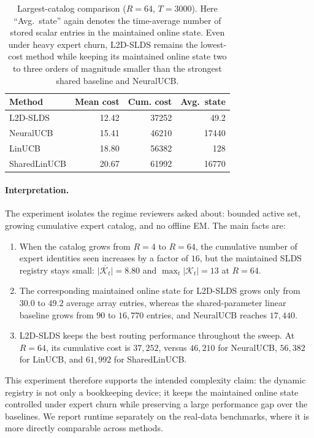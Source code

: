 \begin{table}[t]
\caption{Largest-catalog comparison (\(R=64\), \(T=3000\)). Here ``Avg.\ state'' again denotes the time-average number of stored scalar entries in the maintained online state. Even under heavy expert churn, L2D-SLDS remains the lowest-cost method while keeping its maintained online state two to three orders of magnitude smaller than the strongest shared baseline and NeuralUCB.}
\label{tab:complexity_registry_methods}
\centering
\scriptsize
\begin{tabular}{lrrr}
\toprule
Method & Mean cost & Cum. cost & Avg.\ state \\
\midrule
L2D-SLDS     & 12.42 & 37252 & 49.2 \\
NeuralUCB    & 15.41 & 46210 & 17440 \\
LinUCB       & 18.80 & 56382 & 128 \\
SharedLinUCB & 20.67 & 61992 & 16770 \\
\bottomrule
\end{tabular}
\end{table}

\paragraph{Interpretation.}
The experiment isolates the regime reviewers asked about: bounded active set, growing cumulative expert catalog, and no offline EM. The main facts are:
\begin{enumerate}[leftmargin=1.5em]
    \item When the catalog grows from \(R=4\) to \(R=64\), the cumulative number of expert identities seen increases by a factor of \(16\), but the maintained SLDS registry stays small: \(\overline{|\mathcal K_t|}=8.80\) and \(\max_t |\mathcal K_t| = 13\) at \(R=64\).
    \item The corresponding maintained online state for L2D-SLDS grows only from \(30.0\) to \(49.2\) average array entries, whereas the shared-parameter linear baseline grows from \(90\) to \(16{,}770\) entries, and NeuralUCB reaches \(17{,}440\).
    \item L2D-SLDS keeps the best routing performance throughout the sweep. At \(R=64\), its cumulative cost is \(37{,}252\), versus \(46{,}210\) for NeuralUCB, \(56{,}382\) for LinUCB, and \(61{,}992\) for SharedLinUCB.
\end{enumerate}
This experiment therefore supports the intended complexity claim: the dynamic registry is not only a bookkeeping device; it keeps the maintained online state controlled under expert churn while preserving a large performance gap over the baselines. We report runtime separately on the real-data benchmarks, where it is more directly comparable across methods.
